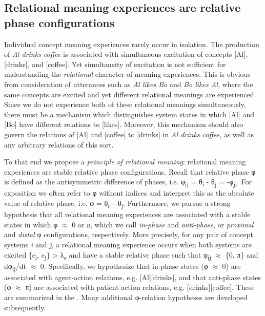 \subsection{Relational meaning experiences are relative phase configurations}

Individual concept meaning experiences rarely occur in isolation. The production of \textit{Al drinks coffee} is associated with simultaneous excitation of concepts [Al], [drinks], and [coffee]. Yet simultaneity of excitation is not sufficient for understanding the \textit{relational} character of meaning experiences. This is obvious from consideration of utterances such as \textit{Al likes Bo} and \textit{Bo likes Al}, where the same concepts are excited and yet different relational meanings are experienced. Since we do not experience both of these relational meanings simultaneously, there must be a mechanism which distinguishes system states in which [Al] and [Bo] have different relations to [likes]. Moreover, this mechanism should also govern the relations of [Al] and [coffee] to [drinks] in \textit{Al drinks coffee}, as well as any arbitrary relations of this sort. 

  To that end we propose a \textit{principle of relational meaning}: relational meaning experiences are stable relative phase configurations. Recall that relative phase φ is defined as the antisymmetric difference of phases, i.e. φ\textsubscript{ij} = θ\textsubscript{i} - θ\textsubscript{j} = -φ\textsubscript{ji}. For exposition we often refer to φ without indices and interpret this as the absolute value of relative phase, i.e. {\textbar}φ{\textbar} = {\textbar}θ\textsubscript{i} – θ\textsubscript{j}{\textbar}. Furthermore, we pursue a strong hypothesis that all relational meaning experiences are associated with a stable states in which φ ${\approx}$ 0 or π, which we call \textit{in-phase} and \textit{anti-phase}, or \textit{proximal} and \textit{distal} φ configurations, respectively. More precisely, for any pair of concept systems \textit{i} and \textit{j}, a relational meaning experience occurs when both systems are excited \{e\textsubscript{i}, e\textsubscript{j}\} > λ\textsubscript{e} and have a stable relative phase such that {\textbar}φ\textsubscript{ij}{\textbar} ${\approx}$ \{0, π\} and dφ\textsubscript{ij}/dt ${\approx}$ 0. Specifically, we hypothesize that in-phase states (φ ${\approx}$ 0) are associated with agent-action relations, e.g. [Al][drinks], and that anti-phase states (φ ${\approx}$ π) are associated with patient-action relations, e.g. [drinks][coffee]. These are summarized in the {\tablebelow}. Many additional φ-relation hypotheses are developed subsequently.

